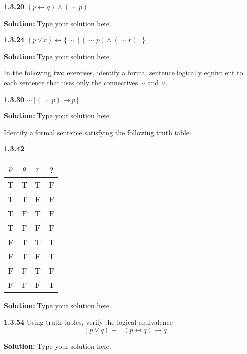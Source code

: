 \documentclass[12pt]{article}
\begin{document}
\noindent\textbf{1.3.20} $(p\leftrightarrow q)\wedge(\sim p)$

\doublespacing
\textbf{Solution:} Type your solution here.

\singlespacing
\vspace{12pt}

\noindent\textbf{1.3.24} $(p\vee r)\leftrightarrow\{\sim[(\sim p)\wedge(\sim r)]\}$

\doublespacing
\textbf{Solution:} Type your solution here.

\singlespacing
\vspace{12pt}

In the following two exercises, identify a formal sentence logically equivalent to each sentence that uses only the connectives $\sim$ and $\vee$.

\vspace{12pt}

\noindent\textbf{1.3.30} $\sim[(\sim p)\rightarrow p]$

\doublespacing
\textbf{Solution:} Type your solution here.

\singlespacing
\vspace{12pt}

Identify a formal sentence satisfying the following truth table: 

\noindent\textbf{1.3.42} 
\begin{center}
\begin{tabular}{c|c|c|c}
$p$&$q$&$r$&?\\
\hline
T&T&T&F\\
T&T&F&F\\
T&F&T&F\\
T&F&F&F\\
F&T&T&T\\
F&T&F&T\\
F&F&T&F\\
F&F&F&T
\end{tabular}
\end{center}

\doublespacing
\textbf{Solution:} Type your solution here.

\singlespacing
\vspace{12pt}

\newpage

\noindent\textbf{1.3.54} Using truth tables, verify the logical equivalence 
\[(p\vee q)\equiv[(p\leftrightarrow q)\rightarrow q].\]

\doublespacing
\textbf{Solution:} Type your solution here.

\singlespacing
\vspace{12pt}
\end{document}
